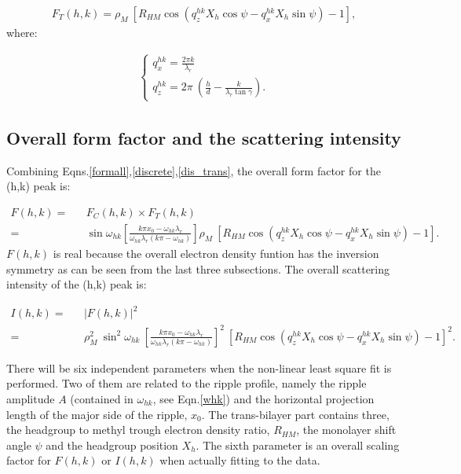 \begin{eqnarray}
\label{dis_trans}
F_T (h,k) = \rho_M\ [R_{HM} \cos (q_z^{hk} X_h \cos \psi 
		- q_x^{hk} X_h \sin \psi) -1],
\end{eqnarray}
where:

\begin{eqnarray}
\label{qxzhk}
\left\{ \begin{array}{ll}
q_x^{hk} =\frac{2 \pi k}{\lambda_r} \\
q_z^{hk} = 2 \pi\ \left( \frac{h}{d} - \frac{k}{\lambda_r \tan \gamma} \right).
\end{array}
\right.
\end{eqnarray}

\subsection{Overall form factor and the scattering intensity}

Combining Eqns.\ref{formall},\ref{discrete},\ref{dis_trans}, the overall 
form factor for the (h,k) peak is:

\begin{eqnarray}
\label{form_dis}
F(h,k) =&& F_C (h,k) \times F_T (h,k) \nonumber\\
=&& \sin \omega_{hk} \left[\frac{k \pi x_0 -
\omega_{hk} \lambda_r}{\omega_{hk} \lambda_r (k \pi - \omega_{hk})} \right]
 \rho_M\ [R_{HM} \cos (q_z^{hk} X_h \cos \psi - q_x^{hk} X_h \sin \psi) -1].
\end{eqnarray}
$F(h,k)$ is real because the overall electron density funtion has the 
inversion symmetry as can be seen from the last three subsections.
The overall scattering intensity of the (h,k) peak is:

\begin{eqnarray}
\label{inten_dis}
I(h,k) =&& |F(h,k)|^2 \nonumber\\
=&& \rho_M^2\ \sin^2 \omega_{hk}\ \left[\frac{k \pi x_0 -
\omega_{hk} \lambda_r}{\omega_{hk} \lambda_r (k \pi - \omega_{hk})} \right]^2\ 
[R_{HM} \cos (q_z^{hk} X_h \cos \psi - q_x^{hk} X_h \sin \psi) -1]^2.
\end{eqnarray}

There will be six independent parameters when the non-linear least square
fit is performed. Two of them are related to the ripple profile, namely
the ripple amplitude $A$ (contained in $\omega_{hk}$, see Eqn.\ref{whk}) and
the horizontal projection length of the major side of the ripple, $x_0$. The
trans-bilayer part contains three, the headgroup to methyl trough electron
density ratio, $R_{HM}$, the monolayer shift angle $\psi$ and the headgroup 
position $X_h$. The sixth parameter is an overall scaling factor for $F(h,k)$ 
or $I(h,k)$ when actually fitting to the data. 
 
